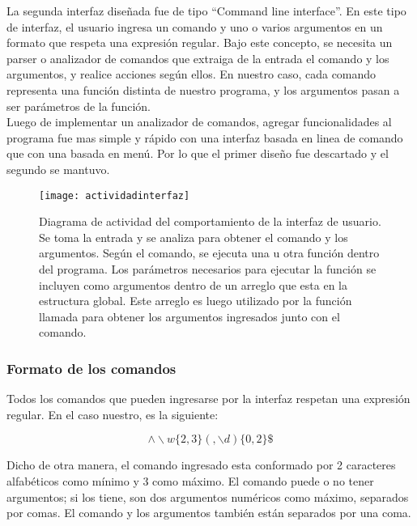 La segunda interfaz diseñada fue de tipo ``Command line interface''. En este tipo de interfaz, el usuario ingresa un comando y uno o varios argumentos en un formato que respeta una expresión regular. Bajo este concepto, se necesita un parser o analizador de comandos que extraiga de la entrada el comando y los argumentos, y realice acciones según ellos. En nuestro caso, cada comando representa una función distinta de nuestro programa, y los argumentos pasan a ser parámetros de la función. \\

Luego de implementar un analizador de comandos, agregar funcionalidades al programa fue mas simple y rápido con una interfaz basada en linea de comando que con una basada en menú. Por lo que el primer diseño fue descartado y el segundo se mantuvo. \\

\begin{figure}[h]
  \centering
  \texttt{[image: actividadinterfaz]}
  \caption[Diagrama de actividad del comportamiento de la interfaz de usuario]{Diagrama de actividad del comportamiento de la interfaz de usuario. Se toma la entrada y se analiza para obtener el comando y los argumentos. Según el comando, se ejecuta una u otra función dentro del programa. Los parámetros necesarios para ejecutar la función se incluyen como argumentos dentro de un arreglo que esta en la estructura global. Este arreglo es luego utilizado por la función llamada para obtener los argumentos ingresados junto con el comando.}\label{fig:actividadinterfaz}
\end{figure}

\subsubsection{Formato de los comandos} %
\label{it2:ssub:formato_de_los_comandos}

Todos los comandos que pueden ingresarse por la interfaz respetan una expresión regular. En el caso nuestro, es la siguiente:

\begin{equation}
\wedge \backslash w \{2,3\} (,\backslash d )\{0,2\} \$
\end{equation}

Dicho de otra manera, el comando ingresado esta conformado por 2 caracteres alfabéticos como mínimo y 3 como máximo. El comando puede o no tener argumentos; si los tiene, son dos argumentos numéricos como máximo, separados por comas. El comando y los argumentos también están separados por una coma.

